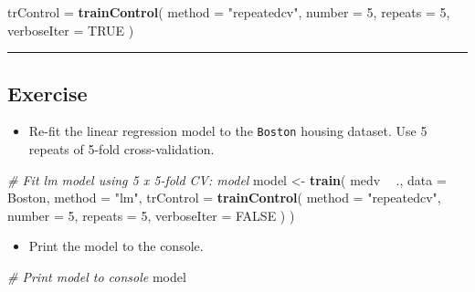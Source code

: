 \documentclass[]{book}
\newenvironment{Shaded}{\begin{snugshade}}{\end{snugshade}}
\newcommand{\KeywordTok}[1]{\textcolor[rgb]{0.13,0.29,0.53}{\textbf{#1}}}
\newcommand{\DataTypeTok}[1]{\textcolor[rgb]{0.13,0.29,0.53}{#1}}
\newcommand{\DecValTok}[1]{\textcolor[rgb]{0.00,0.00,0.81}{#1}}
\newcommand{\StringTok}[1]{\textcolor[rgb]{0.31,0.60,0.02}{#1}}
\newcommand{\CommentTok}[1]{\textcolor[rgb]{0.56,0.35,0.01}{\textit{#1}}}
\newcommand{\OtherTok}[1]{\textcolor[rgb]{0.56,0.35,0.01}{#1}}
\newcommand{\OperatorTok}[1]{\textcolor[rgb]{0.81,0.36,0.00}{\textbf{#1}}}
\newcommand{\NormalTok}[1]{#1}
\providecommand{\tightlist}{%
  \setlength{\itemsep}{0pt}\setlength{\parskip}{0pt}}
\begin{document}
\begin{Shaded}
\begin{Highlighting}[]
\NormalTok{trControl =}\StringTok{ }\KeywordTok{trainControl}\NormalTok{(}
  \DataTypeTok{method =} \StringTok{"repeatedcv"}\NormalTok{, }\DataTypeTok{number =} \DecValTok{5}\NormalTok{,}
  \DataTypeTok{repeats =} \DecValTok{5}\NormalTok{, }\DataTypeTok{verboseIter =} \OtherTok{TRUE}
\NormalTok{)}
\end{Highlighting}
\end{Shaded}

\begin{center}\rule{0.5\linewidth}{\linethickness}\end{center}

\subsection*{Exercise}\label{exercise-7}

\begin{itemize}
\tightlist
\item
  Re-fit the linear regression model to the \texttt{Boston} housing
  dataset. Use 5 repeats of 5-fold cross-validation.
\end{itemize}

\begin{Shaded}
\begin{Highlighting}[]
\CommentTok{# Fit lm model using 5 x 5-fold CV: model}
\NormalTok{model <-}\StringTok{ }\KeywordTok{train}\NormalTok{(}
\NormalTok{  medv }\OperatorTok{~}\StringTok{ }\NormalTok{., }\DataTypeTok{data =}\NormalTok{ Boston,}
  \DataTypeTok{method =} \StringTok{"lm"}\NormalTok{,}
  \DataTypeTok{trControl =} \KeywordTok{trainControl}\NormalTok{(}
    \DataTypeTok{method =} \StringTok{"repeatedcv"}\NormalTok{, }\DataTypeTok{number =} \DecValTok{5}\NormalTok{,}
    \DataTypeTok{repeats =} \DecValTok{5}\NormalTok{, }\DataTypeTok{verboseIter =} \OtherTok{FALSE}
\NormalTok{  )}
\NormalTok{)}
\end{Highlighting}
\end{Shaded}

\begin{itemize}
\tightlist
\item
  Print the model to the console.
\end{itemize}

\begin{Shaded}
\begin{Highlighting}[]
\CommentTok{# Print model to console}
\NormalTok{model}
\end{Highlighting}
\end{Shaded}
\end{document}
